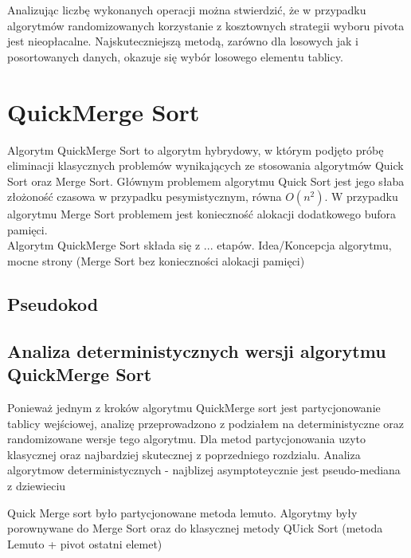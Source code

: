 Analizując liczbę wykonanych operacji można stwierdzić, że w przypadku algorytmów randomizowanych korzystanie z kosztownych strategii wyboru pivota jest nieopłacalne. Najskuteczniejszą metodą, zarówno dla losowych jak i posortowanych danych, okazuje się wybór losowego elementu tablicy.\\


\section{QuickMerge Sort}

Algorytm QuickMerge Sort to algorytm hybrydowy, w którym podjęto próbę eliminacji klasycznych problemów wynikających ze stosowania algorytmów Quick Sort oraz Merge Sort. Głównym problemem algorytmu Quick Sort jest jego słaba złożoność czasowa w przypadku pesymistycznym, równa $O(n^2)$.  W przypadku algorytmu Merge Sort problemem jest konieczność alokacji dodatkowego bufora pamięci.\\ 

Algorytm QuickMerge Sort składa się z ... etapów.
Idea/Koncepcja algorytmu, mocne strony (Merge Sort bez konieczności alokacji pamięci)

\subsection{Pseudokod}

\subsection{Analiza deterministycznych wersji algorytmu QuickMerge Sort}
Ponieważ jednym z kroków algorytmu QuickMerge sort jest partycjonowanie tablicy wejściowej, analizę przeprowadzono z podziałem na deterministyczne oraz randomizowane wersje tego algorytmu.
Dla metod partycjonowania uzyto klasycznej oraz najbardziej skutecznej z poprzedniego rozdzialu.
Analiza algorytmow deterministycznych - najblizej asymptoteycznie jest pseudo-mediana z dziewieciu

Quick Merge sort było partycjonowane metoda lemuto.
Algorytmy były porownywane do Merge Sort oraz do klasycznej metody QUick Sort (metoda Lemuto + pivot ostatni elemet)

